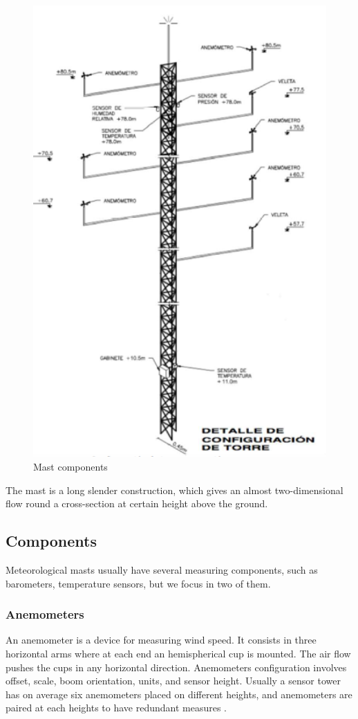 \documentclass[conference]{IEEEtran}
\begin{document}
\begin{figure}[h]
	\centering
	\includegraphics[width=\columnwidth]{Images/MastScheme.png}
	\caption{Mast components}
	\label{fig:mastscheme}
\end{figure}
The mast is a long slender construction, which gives an almost two-dimensional flow round a cross-section at certain height above the ground. 

\subsection{Components}
Meteorological masts usually have several measuring components, such as barometers, temperature sensors, but we focus in two of them.
\subsubsection{Anemometers}
An anemometer is a device for measuring wind speed. It consists in three horizontal arms where at each end an hemispherical cup is mounted. The air flow pushes the cups in any horizontal direction. Anemometers configuration involves offset, scale, boom orientation, units, and sensor height. Usually a sensor tower has on average six anemometers placed on different heights, and  anemometers are paired at each heights to have redundant measures \cite{clifton2014135}.
\end{document}
